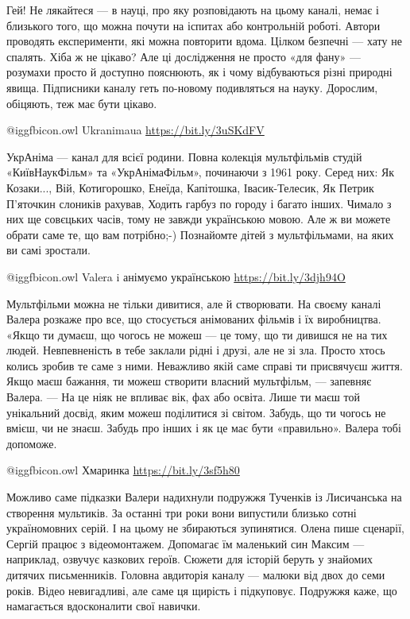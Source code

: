 Гей! Не лякайтеся — в науці, про яку розповідають на цьому каналі, немає і
близького того, що можна почути на іспитах або контрольній роботі. Автори
проводять експерименти, які можна повторити вдома. Цілком безпечні — хату не
спалять. Хіба ж не цікаво? Але ці дослідження не просто «для фану» — розумахи
просто й доступно пояснюють, як і чому відбуваються різні природні явища.
Підписники каналу геть по-новому подивляться на науку. Дорослим, обіцяють, теж
має бути цікаво.

 @igg{fbicon.owl} Ukranimaua \url{https://bit.ly/3uSKdFV}

УкрАніма — канал для всієї родини. Повна колекція мультфільмів студій
«КиївНаукФільм» та «УкрАнімаФільм», починаючи з 1961 року. Серед них: Як
Козаки..., Вій, Котигорошко, Енеїда, Капітошка, Івасик-Телесик, Як Петрик
П'яточкин слоників рахував, Ходить гарбуз по городу і багато інших. Чимало з
них ще совєцьких часів, тому не завжди українською мовою. Але ж ви можете
обрати саме те, що вам потрібно;-) Познайомте дітей з мультфільмами, на яких ви
самі зростали.

 @igg{fbicon.owl} Valera i анімуємо українською \url{https://bit.ly/3djh94O}

Мультфільми можна не тільки дивитися, але й створювати. На своєму каналі Валера
розкаже про все, що стосується анімованих фільмів і їх виробництва. «Якщо ти
думаєш, що чогось не можеш — це тому, що ти дивишся не на тих людей.
Невпевненість в тебе заклали рідні і друзі, але не зі зла. Просто хтось колись
зробив те саме з ними. Неважливо якій саме справі ти присвячуєш життя. Якщо
маєш бажання, ти можеш створити власний мультфільм, — запевняє Валера. — На це
ніяк не впливає вік, фах або освіта. Лише ти маєш той унікальний досвід, яким
можеш поділитися зі світом. Забудь, що ти чогось не вмієш, чи не знаєш. Забудь
про інших і як це має бути «правильно». Валера тобі допоможе.

 @igg{fbicon.owl} Хмаринка \url{https://bit.ly/3sf5h80}

Можливо саме підказки Валери надихнули подружжя Тученків із Лисичанська на
створення мультиків. За останні три роки вони випустили близько сотні
україномовних серій. І на цьому не збираються зупинятися. Олена пише сценарії,
Сергій працює з відеомонтажем. Допомагає їм маленький син Максим — наприклад,
озвучує казкових героїв. Сюжети для історій беруть у знайомих дитячих
письменників. Головна авдиторія каналу — малюки від двох до семи років. Відео
невигадливі, але саме ця щирість і підкуповує. Подружжя каже, що намагається
вдосконалити свої навички.

